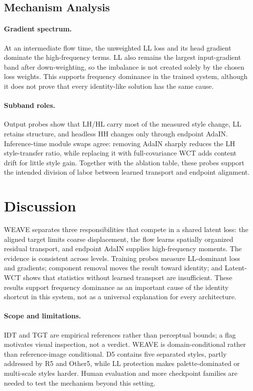 \documentclass[letterpaper]{article}
\begin{document}
\subsection{Mechanism Analysis}
\label{sec:mechanism}

\paragraph{Gradient spectrum.}
At an intermediate flow time, the unweighted LL loss and its head gradient dominate the
high-frequency terms. LL also remains the largest input-gradient band after down-weighting,
so the imbalance is not created solely by the chosen loss weights. This supports frequency
dominance in the trained system, although it does not prove that every identity-like
solution has the same cause.

\paragraph{Subband roles.}
Output probes show that LH/HL carry most of the measured style change, LL retains structure, and headless HH changes only through endpoint AdaIN. Inference-time module swaps agree: removing AdaIN sharply reduces the LH style-transfer ratio, while replacing it with full-covariance WCT adds content drift for little style gain. Together with the ablation table, these probes support the intended division of labor between learned transport and endpoint alignment.

\section{Discussion}
\label{sec:discussion}

WEAVE separates three responsibilities that compete in a shared latent loss: the aligned
target limits coarse displacement, the flow learns spatially organized residual transport,
and endpoint AdaIN supplies high-frequency moments. The evidence is consistent across
levels. Training probes measure LL-dominant loss and gradients; component removal moves the
result toward identity; and Latent-WCT shows that statistics without learned transport are
insufficient. These results support frequency dominance as an important cause of the
identity shortcut in this system, not as a universal explanation for every architecture.

\paragraph{Scope and limitations.}
IDT and TGT are empirical references rather than perceptual bounds; a flag motivates visual
inspection, not a verdict. WEAVE is domain-conditional rather than reference-image
conditional. D5 contains five separated styles, partly addressed by R5 and Other5, while LL
protection makes palette-dominated or multi-scale styles harder. Human evaluation and more
checkpoint families are needed to test the mechanism beyond this setting.
\end{document}
